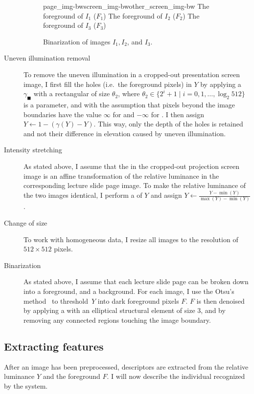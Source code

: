 \begin{description}
\begin{figure}
    \kern\floatsep
      {page_img-bw}{screen_img-bw}{other_screen_img-bw}%
      {The foreground of $I_1$ ($F_1$)}%
      {The foreground of $I_2$ ($F_2$)}%
      {The foreground of $I_3$ ($F_3$)}
    \caption{Binarization of images $I_1,I_2$, and $I_3$.}
    \label{fig:system-preprocessing-last}
  \end{figure}
  \item[Uneven illumination removal]
    To remove the uneven illumination in a cropped-out presentation screen
    image, I first fill the holes (i.e.\ the foreground pixels) in $Y$ by
    applying a  $\gamma_\blacksquare$ with a
    rectangular  of size $\theta_2$, where
    $\theta_2\in\{2^i+1\mid i=0,1,\ldots,\log_2 512\}$
    is a parameter, and with the assumption that pixels beyond the image
    boundaries have the value $\infty$ for  and
    $-\infty$ for . I then assign $Y\leftarrow
    1-(\gamma(Y)-Y)$.  This way, only the depth of the holes is retained and
    not their difference in elevation caused by uneven illumination.
  \item[Intensity stretching]
    As stated above, I assume that the  in the
    cropped-out projection screen image is an affine transformation of the
    relative luminance in the corresponding lecture slide page image. To make
    the relative luminance of the two images identical, I perform a
     of $Y$ and assign
    $Y\leftarrow\frac{Y-\min(Y)}{\max(Y)-\min(Y)}$.
  \item[Change of size]
    To work with homogeneous data, I resize all images to the resolution of
    $512\times 512$ pixels.
  \item[Binarization]
    As stated above, I assume that each lecture slide page can be broken down
    into a foreground, and a background. For each image, I use
    the Otsu's method~\cite{otsu1979threshold} to threshold~$Y$ into dark
    foreground pixels $F$. $F$ is then denoised by applying a
     with an elliptical
    structural element of size 3, and by removing any connected regions
    touching the image boundary.
\end{description}

\subsection{Extracting features}
After an image has been preprocessed, descriptors are extracted from the
relative luminance $Y$ and the foreground $F$. I will now describe the
individual  recognized by the system.

